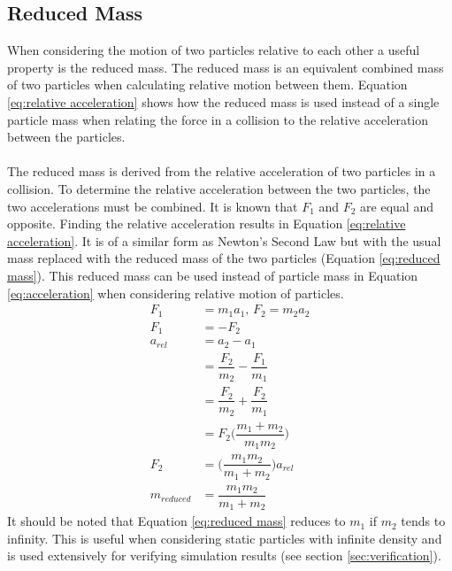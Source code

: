 \documentclass[a4paper,11pt,titlepage]{report}
\begin{document}
\subsection{Reduced Mass}
When considering the motion of two particles relative to each other a useful property is the reduced mass. The reduced mass is an equivalent combined mass of two particles when calculating relative motion between them. Equation \ref{eq:relative acceleration} shows how the reduced mass is used instead of a single particle mass when relating the force in a collision to the relative acceleration between the particles.
\\\\The reduced mass is derived from the relative acceleration of two particles in a collision. To determine the relative acceleration between the two particles, the two accelerations must be combined. It is known that $F_1$ and $F_2$ are equal and opposite. Finding the relative acceleration results in Equation \ref{eq:relative acceleration}. It is of a similar form as Newton's Second Law but with the usual mass replaced with the reduced mass of the two particles (Equation \ref{eq:reduced mass}). This reduced mass can be used instead of particle mass in Equation \ref{eq:acceleration} when considering relative motion of particles.
\begin{align}
F_1 &= m_1 a_1 \nonumber \text{, } F_2 = m_2 a_2 \nonumber
\\F_1 &= -F_2 \nonumber
\\a_{rel} &= a_2 - a_1 \nonumber
\\&= \dfrac{F_2}{m_2} - \dfrac{F_1}{m_1} \nonumber
\\&= \dfrac{F_2}{m_2} + \dfrac{F_2}{m_1} \nonumber
\\&= F_2 \Big(\dfrac{m_1 + m_2}{m_1 m_2}\Big) \nonumber
\\F_2 &= \Big(\dfrac{m_1 m_2}{m_1 + m_2}\Big) a_{rel} \label{eq:relative acceleration}
\\m_{reduced} &= \dfrac{m_1 m_2}{m_1 + m_2} \label{eq:reduced mass}
\end{align}
It should be noted that Equation \ref{eq:reduced mass} reduces to $m_1$ if $m_2$ tends to infinity. This is useful when considering static particles with infinite density and is used extensively for verifying simulation results (see section \ref{sec:verification}).
\end{document}
